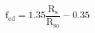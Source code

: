 \documentclass[12pt]{article}
\begin{document}
\begin{displaymath}
\mathrm{f}_{\mathrm{cd}}=1.35 \frac{\mathrm{R}_{\mathrm{s}}}{\mathrm{R}_{\mathrm{so}}}-0.35
\end{displaymath}
\end{document}
